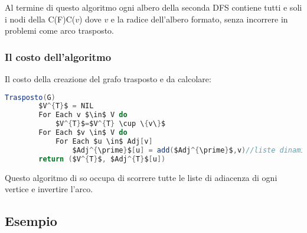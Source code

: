 Al termine di questo algoritmo ogni albero della seconda DFS contiene tutti e soli i nodi della C(F)C($v$) dove $v$ e la radice dell'albero formato, senza incorrere in problemi come arco trasposto.

\subsubsection{Il costo dell'algoritmo}

Il costo della creazione del grafo trasposto e da calcolare:
\begin{lstlisting}[language=Java]
	Trasposto(G)
		$V^{T}$ = NIL
		For Each v $\in$ V do
			$V^{T}$=$V^{T} \cup \{v\}$
		For Each $v \in$ V do
			For Each $u \in$ Adj[v]
				$Adj^{\prime}$[u] = add($Adj^{\prime}$,v)//liste dinamiche 
		return ($V^{T}$, $Adj^{T}$[u])
\end{lstlisting}

Questo algoritmo di so occupa di scorrere tutte le liste di adiacenza di ogni vertice e invertire l'arco.

\subsection{Esempio}


